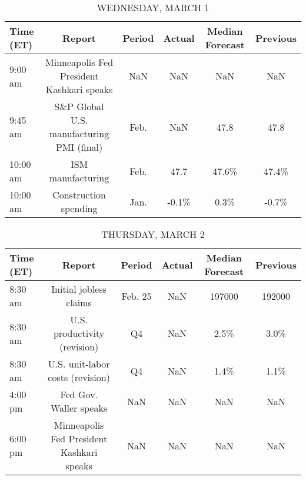 \documentclass{article}%
\begin{document}
%


\begin{table}[htbp]%
\caption{WEDNESDAY, MARCH 1}%
\centering%
\begin{adjustbox}{width=1\textwidth}%
\begin{tabular}{lccccc}
\toprule
Time (ET) &                                    Report & Period & Actual & Median Forecast & Previous \\
\midrule
  9:00 am & Minneapolis Fed President Kashkari speaks &    NaN &    NaN &             NaN &      NaN \\
  9:45 am & S\&P Global U.S. manufacturing PMI (final) &   Feb. &    NaN &            47.8 &     47.8 \\
 10:00 am &                         ISM manufacturing &   Feb. &   47.7 &           47.6\% &    47.4\% \\
 10:00 am &                     Construction spending &   Jan. &  -0.1\% &            0.3\% &    -0.7\% \\
\bottomrule
\end{tabular}
%
\end{adjustbox}%
\end{table}

%


\begin{table}[htbp]%
\caption{THURSDAY, MARCH 2}%
\centering%
\begin{adjustbox}{width=1\textwidth}%
\begin{tabular}{lccccc}
\toprule
Time (ET) &                                    Report &  Period & Actual & Median Forecast & Previous \\
\midrule
  8:30 am &                    Initial jobless claims & Feb. 25 &    NaN &          197000 &   192000 \\
  8:30 am &              U.S. productivity (revision) &      Q4 &    NaN &            2.5\% &     3.0\% \\
  8:30 am &          U.S. unit-labor costs (revision) &      Q4 &    NaN &            1.4\% &     1.1\% \\
  4:00 pm &                    Fed Gov. Waller speaks &     NaN &    NaN &             NaN &      NaN \\
  6:00 pm & Minneapolis Fed President Kashkari speaks &     NaN &    NaN &             NaN &      NaN \\
\bottomrule
\end{tabular}
%
\end{adjustbox}%
\end{table}
\end{document}

